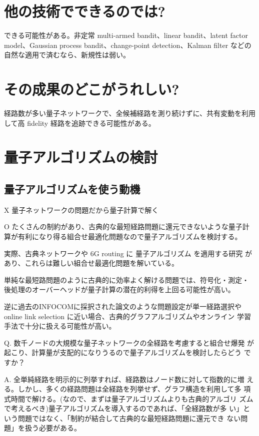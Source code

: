 \documentclass[conference]{IEEEtran}
\begin{document}
\section{他の技術でできるのでは?}
\label{sec:org7d1d038}
できる可能性がある。非定常 multi-armed bandit、linear bandit、latent factor model、Gaussian process bandit、change-point detection、Kalman filter などの自然な適用で済むなら、新規性は弱い。

\section{その成果のどこがうれしい?}
\label{sec:org56d93f5}
経路数が多い量子ネットワークで、全候補経路を測り続けずに、共有変動を利用して高 fidelity 経路を追跡できる可能性がある。






\section{量子アルゴリズムの検討}
\label{sec:org3f7bf72}

\subsection{量子アルゴリズムを使う動機}
\label{sec:orgc019b55}
X 量子ネットワークの問題だから量子計算で解く 

O たくさんの制約があり、古典的な最短経路問題に還元できないような量子計
算が有利になり得る組合せ最適化問題なので量子アルゴリズムを検討する。

実際、古典ネットワークや 6G routing に 量子アルゴリズム を適用する研究
があり、これらは難しい組合せ最適化問題を解いている。

単純な最短路問題のように古典的に効率よく解ける問題では、符号化・測定・
後処理のオーバーヘッドが量子計算の潜在的利得を上回る可能性が高い。

逆に過去のINFOCOMに採択された論文のような問題設定が単一経路選択や
online link selection に近い場合、古典的グラフアルゴリズムやオンライン
学習手法で十分に扱える可能性が高い。

Q. 数千ノードの大規模な量子ネットワークの全経路を考慮すると組合せ爆発
が起こり、計算量が支配的になりうるので量子アルゴリズムを検討したらどう
ですか？

A. 全単純経路を明示的に列挙すれば、経路数はノード数に対して指数的に増
える。しかし、多くの経路問題は全経路を列挙せず、グラフ構造を利用して多
項式時間で解ける。(なので、まずは量子アルゴリズムよりも古典的アルゴリ
ズムで考えるべき)量子アルゴリズムを導入するのであれば、「全経路数が多
い」という問題ではなく、「制約が結合して古典的な最短経路問題に還元でき
ない問題」を扱う必要がある。
\end{document}
